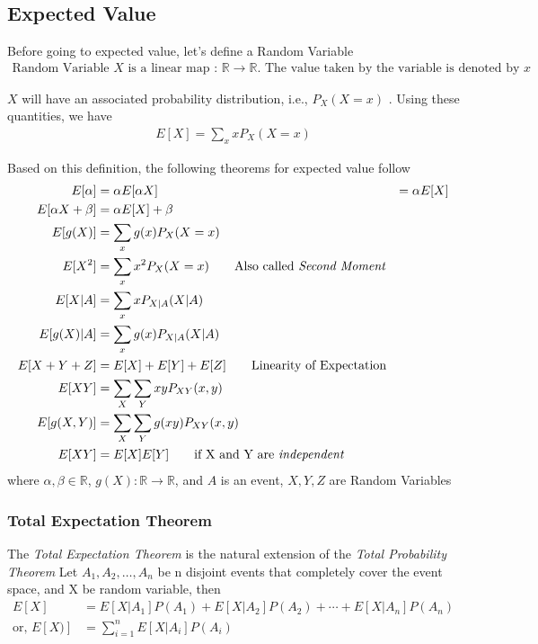 \documentclass[../probability-notes.tex]{subfiles}
\begin{document}
    \subsection{Expected Value}
    Before going to expected value, let's define a Random Variable
    \begin{align*}
        \text{Random Variable } X \text{ is a linear map : } \mathbb{R} \to \mathbb{R} \text{. The value taken by the variable is denoted by } x
    \end{align*}
    
    $X$ will have an associated probability distribution, i.e., $P_{X}(X = x)$ . Using these quantities, we have
    \begin{align*}
        E[X] = \sum_x xP_{X}(X = x) \tag*{Expected Value}
    \end{align*}

    Based on this definition, the following theorems for expected value follow
    \begin{align*}
        E[\alpha] &= \alpha
        E[\alpha X] &= \alpha E[X] \\
        E[\alpha X + \beta] &= \alpha E[X] + \beta \\
        E[g(X)] &= \sum_x g(x)P_{X}(X = x) \\
        E[X^{2}] &= \sum_x x^{2} P_{X}(X = x) \tag*{Also called \emph{Second Moment}}\\
        E[X|A] &= \sum_{x} x P_{X|A}(X|A) \\
        E[g(X)|A] &= \sum_{x} g(x) P_{X|A}(X|A) \\
        E[X + Y + Z] &= E[X] + E[Y] + E[Z] \tag*{Linearity of Expectation}\\
        E[XY] &= \sum_{X} \sum_{Y} xy P_{XY}(x,y) \\
        E[g(X,Y)] &= \sum_{X} \sum_{Y} g(xy) P_{XY}(x,y) \\
        E[XY] &= E[X]E[Y] \tag*{if X and Y are \emph{independent}}
    \end{align*}
    where $\alpha, \beta \in \mathbb{R}$, $g(X) : \mathbb{R} \rightarrow \mathbb{R}$, and $A$ is an event, $X, Y, Z$ are Random Variables

    \subsubsection{Total Expectation Theorem}
    The \emph{Total Expectation Theorem} is the natural extension of the \emph{Total Probability Theorem}
    Let $A_{1}, A_{2}, \ldots, A_{n}$ be n disjoint events that completely cover the event space, and X be random variable, then
    \begin{align*}
        E[X] &= E[X|A_{1}]P(A_{1}) + E[X|A_{2}]P(A_{2}) + \cdots + E[X|A_{n}]P(A_{n})\\
        \text{or, } E[X)] &= \sum_{i=1}^{n} E[X|A_{i}]P(A_{i})
    \end{align*}
\end{document}
